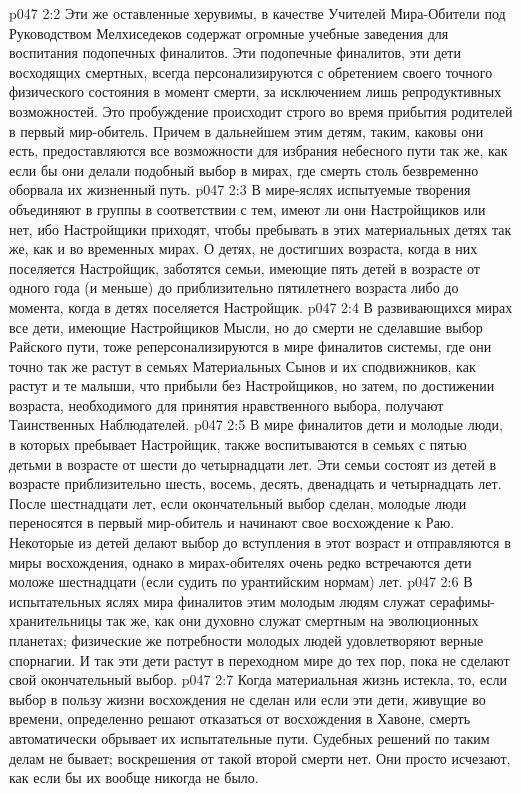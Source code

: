 \vs p047 2:2 Эти же оставленные херувимы, в качестве Учителей Мира\hyp{}Обители под Руководством Мелхиседеков содержат огромные учебные заведения для воспитания подопечных финалитов. Эти подопечные финалитов, эти дети восходящих смертных, всегда персонализируются с обретением своего точного физического состояния в момент смерти, за исключением лишь репродуктивных возможностей. Это пробуждение происходит строго во время прибытия родителей в первый мир\hyp{}обитель. Причем в дальнейшем этим детям, таким, каковы они есть, предоставляются все возможности для избрания небесного пути так же, как если бы они делали подобный выбор в мирах, где смерть столь безвременно оборвала их жизненный путь.
\vs p047 2:3 В мире\hyp{}яслях испытуемые творения объединяют в группы в соответствии с тем, имеют ли они Настройщиков или нет, ибо Настройщики приходят, чтобы пребывать в этих материальных детях так же, как и во временных мирах. О детях, не достигших возраста, когда в них поселяется Настройщик, заботятся семьи, имеющие пять детей в возрасте от одного года (и меньше) до приблизительно пятилетнего возраста либо до момента, когда в детях поселяется Настройщик.
\vs p047 2:4 В развивающихся мирах все дети, имеющие Настройщиков Мысли, но до смерти не сделавшие выбор Райского пути, тоже реперсонализируются в мире финалитов системы, где они точно так же растут в семьях Материальных Сынов и их сподвижников, как растут и те малыши, что прибыли без Настройщиков, но затем, по достижении возраста, необходимого для принятия нравственного выбора, получают Таинственных Наблюдателей.
\vs p047 2:5 В мире финалитов дети и молодые люди, в которых пребывает Настройщик, также воспитываются в семьях с пятью детьми в возрасте от шести до четырнадцати лет. Эти семьи состоят из детей в возрасте приблизительно шесть, восемь, десять, двенадцать и четырнадцать лет. После шестнадцати лет, если окончательный выбор сделан, молодые люди переносятся в первый мир\hyp{}обитель и начинают свое восхождение к Раю. Некоторые из детей делают выбор до вступления в этот возраст и отправляются в миры восхождения, однако в мирах\hyp{}обителях очень редко встречаются дети моложе шестнадцати (если судить по урантийским нормам) лет.
\vs p047 2:6 В испытательных яслях мира финалитов этим молодым людям служат серафимы\hyp{}хранительницы так же, как они духовно служат смертным на эволюционных планетах; физические же потребности молодых людей удовлетворяют верные спорнагии. И так эти дети растут в переходном мире до тех пор, пока не сделают свой окончательный выбор.
\vs p047 2:7 Когда материальная жизнь истекла, то, если выбор в пользу жизни восхождения не сделан или если эти дети, живущие во времени, определенно решают отказаться от восхождения в Хавоне, смерть автоматически обрывает их испытательные пути. Судебных решений по таким делам не бывает; воскрешения от такой второй смерти нет. Они просто исчезают, как если бы их вообще никогда не было.
